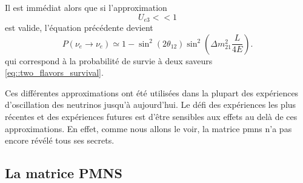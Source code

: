         Il est immédiat alors que si l'approximation 
        \begin{equation}\label{eq::approx_13_eq_0}
          U_{e3} << 1
        \end{equation}
        est valide, l'équation précédente devient
        \begin{equation}\label{eq::solar_oscillation}
          P(\nu_e\to\nu_e) \simeq 1-\sin^2(2\theta_{12})\sin^2\left(\Delta m^2_{21}\frac{L}{4E}\right).
        \end{equation}
        qui correspond à la probabilité de survie à deux saveurs \eqref{eq::two_flavors_survival}.
        
        Ces différentes approximations ont été utilisées dans la plupart des expériences d'oscillation des neutrinos jusqu'à aujourd'hui. Le défi des expériences les plus récentes et des expériences futures est d'être sensibles aux effets au delà de ces approximations. En effet, comme nous allons le voir, la matrice \gls{pmns} n'a pas encore révélé tous ses secrets.

    \subsection{La matrice PMNS}\label{sec::pmns}

